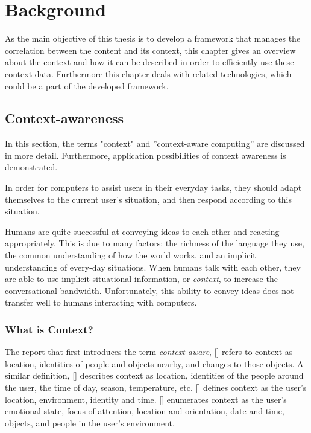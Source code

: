\chapter{Background\label{cha:chapter2}}
As the main objective of this thesis is to develop a framework that manages the correlation between the content and its context, this chapter gives an overview about the context and how it can be described in order to efficiently use these context data. Furthermore this chapter deals with related technologies, which could be a part of the developed framework.

\section{Context-awareness\label{sec:back_con_aw}}
In this section, the terms "context" and ''context-aware computing'' are discussed in more detail. Furthermore, application possibilities of context awareness is demonstrated.

In order for computers to assist users in their everyday tasks, they should adapt themselves to the current user's situation, and then respond according to this situation. 

Humans are quite successful at conveying ideas to each other and reacting appropriately. This is due to many factors: the richness of the language they use, the common understanding of how the world works, and an implicit understanding of every-day situations. When humans talk with each other, they are able to use implicit situational information, or \emph{context}, to increase the conversational bandwidth. Unfortunately, this ability to convey ideas does not transfer well to humans interacting with computers.\citeauthor{Dey2000b}

\subsection{What is Context?}

The report that first introduces the term \emph{context-aware}, [\citeauthor{ieee313011}] refers to context as location, identities of people and objects nearby, and changes to those objects. A similar definition, [\citeauthor{ieee626984}] describes context as location, identities of the people around the user, the time of day, season, temperature, etc. [\citeauthor{Ryan97}] defines context as the user's location, environment, identity and time. [\citeauthor{Dey98}] enumerates context as the user's emotional state, focus of attention, location and orientation, date and time, objects, and people in the user's environment. %


